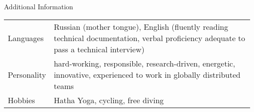 \documentclass{resume} %
\begin{document}

\begin{rSection}{Additional Information}

\begin{table}[h]
\begin{tabularx}{\textwidth}{l X}
Languages & Russian (mother tongue), English (fluently reading technical documentation, verbal proficiency adequate to pass a technical interview) \\
Personality & hard-working, responsible, research-driven, energetic, innovative, experienced to 
work in globally distributed teams \\
Hobbies & Hatha Yoga, cycling, free diving
\end{tabularx}
\end{table}

\end{rSection}

\end{document}
